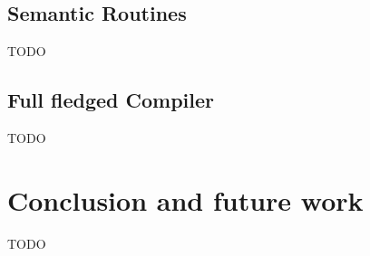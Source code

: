 \documentclass[12pt]{article}
\begin{document}
    	\subsection{Semantic Routines}
    		TODO

    	\subsection{Full fledged Compiler}
    		TODO

    \section{Conclusion and future work}	
			TODO	    
    
 
\end{document}
